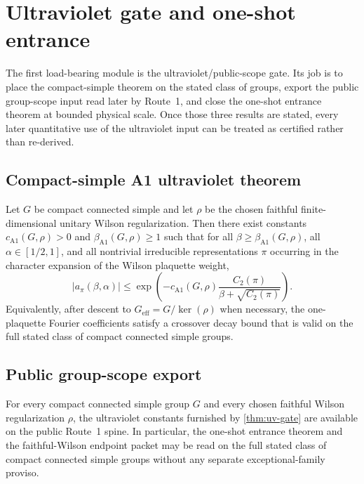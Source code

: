 \section{Ultraviolet gate and one-shot entrance}\label{sec:uv}

The first load-bearing module is the ultraviolet/public-scope gate. Its job is to place the compact-simple theorem on the stated class of groups, export the public group-scope input read later by Route~1, and close the one-shot entrance theorem at bounded physical scale. Once those three results are stated, every later quantitative use of the ultraviolet input can be treated as certified rather than re-derived.

\subsection{Compact-simple A1 ultraviolet theorem}

\begin{theorem}\label{thm:uv-gate}
Let $G$ be compact connected simple and let $\rho$ be the chosen faithful finite-dimensional unitary Wilson regularization. Then there exist constants $c_{\mathrm{A1}}(G,\rho)>0$ and $\beta_{\mathrm{A1}}(G,\rho)\geq 1$ such that for all $\beta\geq \beta_{\mathrm{A1}}(G,\rho)$, all $\alpha\in[1/2,1]$, and all nontrivial irreducible representations $\pi$ occurring in the character expansion of the Wilson plaquette weight,
\[
  |a_\pi(\beta,\alpha)|\leq \exp\!\left(-c_{\mathrm{A1}}(G,\rho)\frac{C_2(\pi)}{\beta+\sqrt{C_2(\pi)}}\right).
\]
Equivalently, after descent to $G_{\mathrm{eff}}=G/\ker(\rho)$ when necessary, the one-plaquette Fourier coefficients satisfy a crossover decay bound that is valid on the full stated class of compact connected simple groups.
\end{theorem}

\subsection{Public group-scope export}

\begin{corollary}\label{cor:group-scope-export}
For every compact connected simple group $G$ and every chosen faithful Wilson regularization $\rho$, the ultraviolet constants furnished by \cref{thm:uv-gate} are available on the public Route~1 spine. In particular, the one-shot entrance theorem and the faithful-Wilson endpoint packet may be read on the full stated class of compact connected simple groups without any separate exceptional-family proviso.
\end{corollary}

